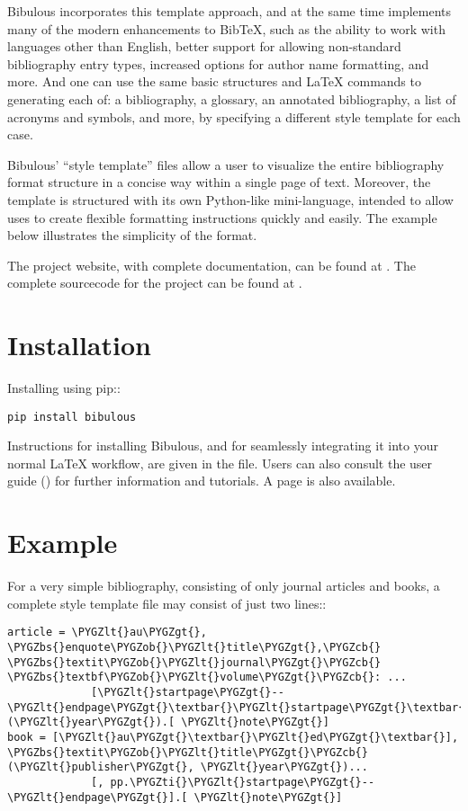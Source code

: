 \documentclass[letterpaper,10pt,english]{sphinxmanual}
\def\PYGZbs{\char`\\}
\def\PYGZob{\char`\{}
\def\PYGZcb{\char`\}}
\def\PYGZlt{\char`\<}
\def\PYGZgt{\char`\>}
\def\PYGZti{\char`\~}
\begin{document}
Bibulous incorporates this template approach, and at the same time implements many of the modern enhancements to BibTeX, such as the ability to work with languages other than English, better support for allowing non-standard bibliography entry types, increased options for author name formatting, and more. And one can use the same basic structures and LaTeX commands to generating each of: a bibliography, a glossary, an annotated bibliography, a list of acronyms and symbols, and more, by specifying a different style template for each case.

Bibulous' “style template” files allow a user to visualize the entire bibliography format structure in a concise way within a single page of text. Moreover, the template is structured with its own Python-like mini-language, intended to allow uses to create flexible formatting instructions quickly and easily. The example below illustrates the simplicity of the format.

The project website, with complete documentation, can be found at . The complete sourcecode for the project can be found at .


\section{Installation}
\label{index:installation}
Installing using pip::

\begin{Verbatim}[commandchars=\\\{\}]
pip install bibulous
\end{Verbatim}

Instructions for installing Bibulous, and for seamlessly integrating it into your normal LaTeX workflow, are given in the  file. Users can also consult the user guide () for further information and tutorials. A  page is also available.


\section{Example}
\label{index:example}
For a very simple bibliography, consisting of only journal articles and books, a complete style template file may consist of just two lines::

\begin{Verbatim}[commandchars=\\\{\}]
article = \PYGZlt{}au\PYGZgt{}, \PYGZbs{}enquote\PYGZob{}\PYGZlt{}title\PYGZgt{},\PYGZcb{} \PYGZbs{}textit\PYGZob{}\PYGZlt{}journal\PYGZgt{}\PYGZcb{} \PYGZbs{}textbf\PYGZob{}\PYGZlt{}volume\PYGZgt{}\PYGZcb{}: ...
             [\PYGZlt{}startpage\PYGZgt{}--\PYGZlt{}endpage\PYGZgt{}\textbar{}\PYGZlt{}startpage\PYGZgt{}\textbar{}\PYGZlt{}eid\PYGZgt{}\textbar{}] (\PYGZlt{}year\PYGZgt{}).[ \PYGZlt{}note\PYGZgt{}]
book = [\PYGZlt{}au\PYGZgt{}\textbar{}\PYGZlt{}ed\PYGZgt{}\textbar{}], \PYGZbs{}textit\PYGZob{}\PYGZlt{}title\PYGZgt{}\PYGZcb{} (\PYGZlt{}publisher\PYGZgt{}, \PYGZlt{}year\PYGZgt{})...
             [, pp.\PYGZti{}\PYGZlt{}startpage\PYGZgt{}--\PYGZlt{}endpage\PYGZgt{}].[ \PYGZlt{}note\PYGZgt{}]
\end{Verbatim}
\end{document}
